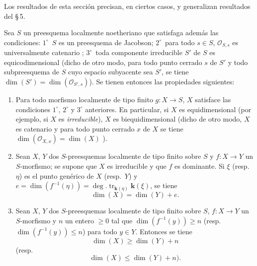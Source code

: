 Los resultados de esta sección precisan, en ciertos casos, y generalizan resultados del \S\,5.

\begin{proposition}[10.6.1]
\label{IV.10.6.1}
Sea $S$ un preesquema localmente noetheriano que satisfaga además las condiciones: $1^\circ$~$S$ es un preesquema de Jacobson; $2^\circ$~para todo $s\in S$, $\mathcal O_{S,s}$ es universalmente catenario ; $3^\circ$~toda componente irreducible $S'$ de $S$ es equicodimensional \textup{(dicho de otro modo, para todo punto cerrado $s$ de $S'$ y todo subpreesquema de $S$ cuyo espacio subyacente sea $S'$, se tiene $\dim(S')=\dim(\mathcal O_{S',s})$)}.
Se tienen entonces las propiedades siguientes:
\begin{enumerate}[label=\textup{(\roman*)}]
  \item Para todo morfismo localmente de tipo finito $g:X\to S$, $X$ satisface las condiciones $1^\circ$, $2^\circ$ y $3^\circ$ anteriores.
En particular, si $X$ es equidimensional \textup{(por ejemplo, si $X$ es \emph{irreducible})}, $X$ es biequidimensional \textup{(dicho de otro modo, $X$ es catenario y para todo punto cerrado $x$ de $X$ se tiene $\dim(\mathcal O_{X,x})=\dim(X)$ )}.
  \item Sean $X$, $Y$ dos $S$-preesquemas localmente de tipo finito sobre $S$ y $f:X\to Y$ un $S$-morfismo; se supone que $X$ es irreducible y que $f$ es dominante.
Si $\xi$ \textup{(resp.\ $\eta$)} es el punto genérico de $X$ \textup{(resp.\ $Y$)} y $e=\dim(f^{-1}(\eta))=\deg.\operatorname{tr}_{\mathbf{k}(\eta)}\boldsymbol{k}(\xi)$, se tiene
\begin{equation}
  \label{IV.10.6.1.1-fr}
  \tag{10.6.1.1}
  \dim(X)=\dim(Y)+e.
  \end{equation}
  \item Sean $X$, $Y$ dos $S$-preesquemas localmente de tipo finito sobre $S$, $f:X\to Y$ un $S$-morfismo y $n$ un entero $\geq0$ tal que $\dim(f^{-1}(y))\geq n$ \textup{(resp.\ $\dim(f^{-1}(y))\leq n$)} para todo $y\in Y$.
Entonces se tiene
\begin{equation}
  \label{IV.10.6.1.2-fr}
  \tag{10.6.1.2}
  \dim(X)\geq\dim(Y)+n
  \end{equation}
\textup{(resp.}
\begin{equation}
  \label{IV.10.6.1.3-fr}
  \tag{10.6.1.3}
  \dim(X)\leq\dim(Y)+n).
  \end{equation}
\end{enumerate}
\end{proposition}

